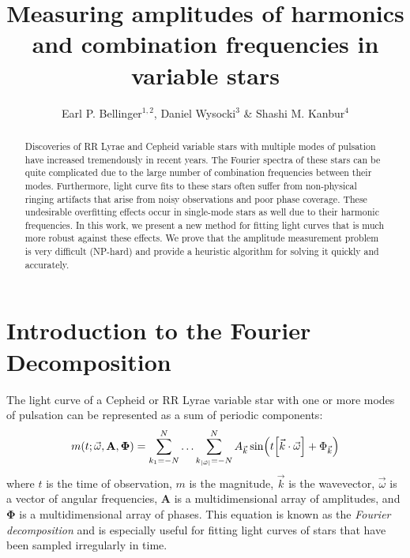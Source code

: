 \documentclass[11pt,twoside]{book}
\begin{document}
\pagestyle{myheadings}
\setcounter{equation}{0}\setcounter{figure}{0}\setcounter{footnote}{0}\setcounter{section}{0}\setcounter{table}{0}\setcounter{page}{1}
\title{Measuring amplitudes of harmonics and combination frequencies in variable stars}
\author{Earl P. Bellinger$^{1,2}$, Daniel Wysocki$^3$ \& Shashi M. Kanbur$^4$}

\begin{abstract}
Discoveries of RR Lyrae and Cepheid variable stars with multiple modes of pulsation have increased tremendously in recent years. The Fourier spectra of these stars can be quite complicated due to the large number of combination frequencies between their modes. Furthermore, light curve fits to these stars often suffer from non-physical ringing artifacts that arise from noisy observations and poor phase coverage. These undesirable overfitting effects occur in single-mode stars as well due to their harmonic frequencies. In this work, we present a new method for fitting light curves that is much more robust against these effects. We prove that the amplitude measurement problem is very difficult (NP-hard) and provide a heuristic algorithm for solving it quickly and accurately. 
\end{abstract}

\section{Introduction to the Fourier Decomposition}
The light curve of a Cepheid or RR Lyrae variable star with one or more modes of pulsation can be represented as a sum of periodic components:
\begin{equation}
    m(t ; \vec \omega, \mathbf A, \boldsymbol \Phi) = \sum_{k_1={-N}}^N \ldots \sum_{k_{|\vec \omega|}={-N}}^N A_{\vec k} \sin(t\qty[\vec k\cdot \vec \omega] + \Phi_{\vec k})
\end{equation}
where $t$ is the time of observation, $m$ is the magnitude, $\vec k$ is the wavevector, $\vec \omega$ is a vector of angular frequencies, $\mathbf A$ is a multidimensional array of amplitudes, and $\boldsymbol \Phi$ is a multidimensional array of phases. This equation is known as the \emph{Fourier decomposition} and is especially useful for fitting light curves of stars that have been sampled irregularly in time.
\end{document}
